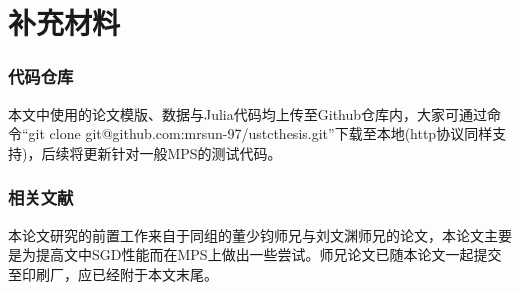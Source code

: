 
\chapter{补充材料}

\subsection{代码仓库}

本文中使用的论文模版、数据与Julia代码均上传至Github仓库内，大家可通过命令``git clone git@github.com:mrsun-97/ustcthesis.git''下载至本地(http协议同样支持)，后续将更新针对一般MPS的测试代码。

\subsection{相关文献}

本论文研究的前置工作来自于同组的董少钧师兄与刘文渊师兄的论文，本论文主要是为提高文中SGD性能而在MPS上做出一些尝试。师兄论文已随本论文一起提交至印刷厂，应已经附于本文末尾。

